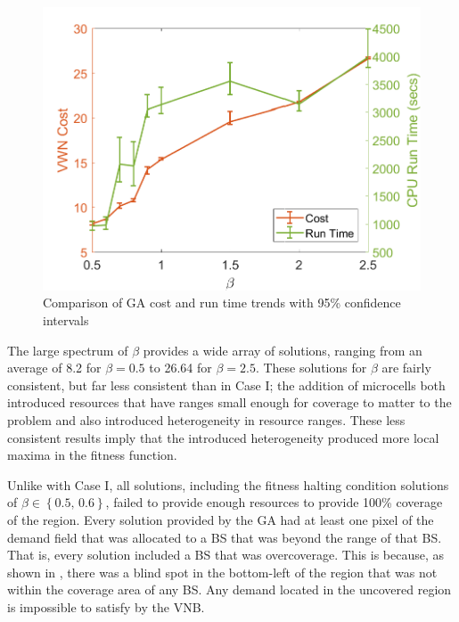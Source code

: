 \documentclass[12pt,dvipsnames]{report}
\begin{document}
\begin{figure}[htp]
	\centering
	\includegraphics[height=0.4\textheight]{Figures/CaseII_GAComparisonCostRunTime}
	\caption[Comparison of Case II GA approach cost and run time]{Comparison of GA cost and run time trends with 95\% confidence intervals}
	\label{fig:CaseII_GAComparisonCostRunTime}
\end{figure}

The large spectrum of $\beta$ provides a wide array of solutions, ranging from an average of 8.2 for $\beta = 0.5$ to 26.64 for $\beta = 2.5$.  These solutions for $\beta$ are fairly consistent, but far less consistent than in Case I; the addition of microcells both introduced resources that have ranges small enough for coverage to matter to the problem and also introduced heterogeneity in resource ranges.  These less consistent results imply that the introduced heterogeneity produced more local maxima in the fitness function.

Unlike with Case I, all solutions, including the fitness halting condition solutions of $\beta \in \left\{ 0.5,\, 0.6 \right\}$, failed to provide enough resources to provide 100\% coverage of the region.  Every solution provided by the GA had at least one pixel of the demand field that was allocated to a BS that was beyond the range of that BS.  That is, every solution included a BS that was overcoverage.  This is because, as shown in , there was a blind spot in the bottom-left of the region that was not within the coverage area of any BS.  Any demand located in the uncovered region is impossible to satisfy by the VNB.
\end{document}
